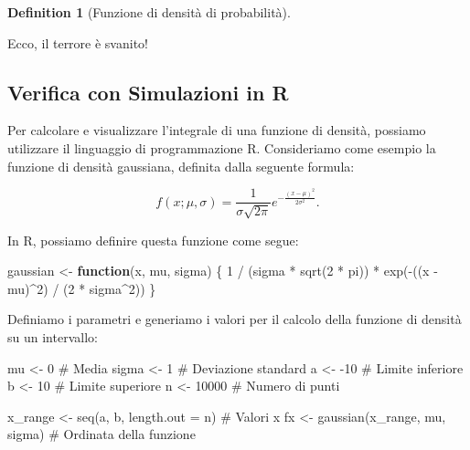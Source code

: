 \documentclass[
  letterpaper,
  DIV=11,
  numbers=noendperiod,
  oneside]{scrreprt}
\newenvironment{Shaded}{\begin{snugshade}}{\end{snugshade}}
\newcommand{\AttributeTok}[1]{\textcolor[rgb]{0.40,0.45,0.13}{#1}}
\newcommand{\CommentTok}[1]{\textcolor[rgb]{0.37,0.37,0.37}{#1}}
\newcommand{\ControlFlowTok}[1]{\textcolor[rgb]{0.00,0.23,0.31}{\textbf{#1}}}
\newcommand{\DecValTok}[1]{\textcolor[rgb]{0.68,0.00,0.00}{#1}}
\newcommand{\FunctionTok}[1]{\textcolor[rgb]{0.28,0.35,0.67}{#1}}
\newcommand{\NormalTok}[1]{\textcolor[rgb]{0.00,0.23,0.31}{#1}}
\newcommand{\OtherTok}[1]{\textcolor[rgb]{0.00,0.23,0.31}{#1}}
\newcommand{\SpecialCharTok}[1]{\textcolor[rgb]{0.37,0.37,0.37}{#1}}
\theoremstyle{definition}
\theoremstyle{plain}
\theoremstyle{definition}
\newtheorem{definition}{Definition}[chapter]
\theoremstyle{remark}
\begin{document}
\begin{definition}[Funzione di densità di
probabilità]
\begin{tcolorbox}
Ecco, il terrore è svanito!

\end{tcolorbox}

\subsection{Verifica con Simulazioni in
R}\label{verifica-con-simulazioni-in-r}

Per calcolare e visualizzare l'integrale di una funzione di densità,
possiamo utilizzare il linguaggio di programmazione R. Consideriamo come
esempio la funzione di densità gaussiana, definita dalla seguente
formula:

\[
f(x; \mu, \sigma) = \frac{1}{\sigma \sqrt{2 \pi}} e^{-\frac{(x - \mu)^2}{2 \sigma^2}}.
\]

In R, possiamo definire questa funzione come segue:

\begin{Shaded}
\begin{Highlighting}[]
\NormalTok{gaussian }\OtherTok{\textless{}{-}} \ControlFlowTok{function}\NormalTok{(x, mu, sigma) \{}
  \DecValTok{1} \SpecialCharTok{/}\NormalTok{ (sigma }\SpecialCharTok{*} \FunctionTok{sqrt}\NormalTok{(}\DecValTok{2} \SpecialCharTok{*}\NormalTok{ pi)) }\SpecialCharTok{*} \FunctionTok{exp}\NormalTok{(}\SpecialCharTok{{-}}\NormalTok{((x }\SpecialCharTok{{-}}\NormalTok{ mu)}\SpecialCharTok{\^{}}\DecValTok{2}\NormalTok{) }\SpecialCharTok{/}\NormalTok{ (}\DecValTok{2} \SpecialCharTok{*}\NormalTok{ sigma}\SpecialCharTok{\^{}}\DecValTok{2}\NormalTok{))}
\NormalTok{\}}
\end{Highlighting}
\end{Shaded}

Definiamo i parametri e generiamo i valori per il calcolo della funzione
di densità su un intervallo:

\begin{Shaded}
\begin{Highlighting}[]
\NormalTok{mu }\OtherTok{\textless{}{-}} \DecValTok{0}      \CommentTok{\# Media}
\NormalTok{sigma }\OtherTok{\textless{}{-}} \DecValTok{1}   \CommentTok{\# Deviazione standard}
\NormalTok{a }\OtherTok{\textless{}{-}} \SpecialCharTok{{-}}\DecValTok{10}     \CommentTok{\# Limite inferiore}
\NormalTok{b }\OtherTok{\textless{}{-}} \DecValTok{10}      \CommentTok{\# Limite superiore}
\NormalTok{n }\OtherTok{\textless{}{-}} \DecValTok{10000}   \CommentTok{\# Numero di punti}

\NormalTok{x\_range }\OtherTok{\textless{}{-}} \FunctionTok{seq}\NormalTok{(a, b, }\AttributeTok{length.out =}\NormalTok{ n)  }\CommentTok{\# Valori x}
\NormalTok{fx }\OtherTok{\textless{}{-}} \FunctionTok{gaussian}\NormalTok{(x\_range, mu, sigma)   }\CommentTok{\# Ordinata della funzione}
\end{Highlighting}
\end{Shaded}


\end{definition}
\end{document}
